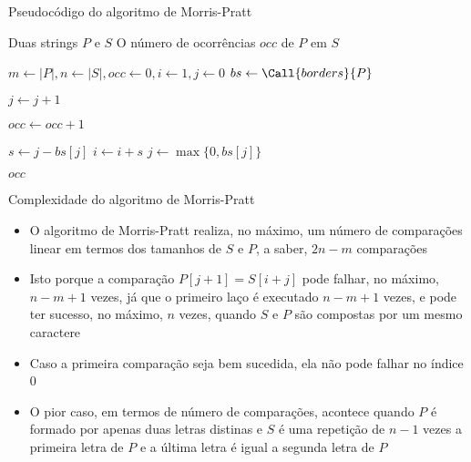 \begin{frame}[fragile]{Pseudocódigo do algoritmo de Morris-Pratt}

    \begin{algorithm}[H]
        \caption{Algoritmo de Morris-Pratt}
        \begin{algorithmic}[1]
            \Require Duas strings $P$ e $S$
            \Ensure O número de ocorrências $occ$ de $P$ em $S$

                \State $m \gets |P|, n \gets |S|, occ \gets 0, i \gets 1, j \gets 0$
                \State $bs \gets \Call{borders}{P}$

                        \State $j \gets j + 1$
                    \EndWhile

                        \State $occ \gets occ + 1$
                    \EndIf

                    \State $s \gets j - bs[j]$
                    \State $i \gets i + s$
                    \State $j \gets \max\lbrace 0, bs[j]\rbrace$
                \EndWhile

                \State \Return $occ$
            \EndFunction
        \end{algorithmic}
    \end{algorithm}

\end{frame}



\begin{frame}[fragile]{Complexidade do algoritmo de Morris-Pratt}

    \begin{itemize}
        \item O algoritmo de Morris-Pratt realiza, no máximo, um número de comparações linear em 
            termos dos tamanhos de $S$ e $P$, a saber, $2n - m$ comparações

        \item Isto porque a comparação $P[j + 1] = S[i + j]$ pode falhar, no máximo, 
            $n - m + 1$ vezes, já que o primeiro laço é executado $n - m + 1$ vezes, e pode ter 
            sucesso, no máximo, $n$ vezes, quando $S$ e $P$ são compostas por um mesmo
            caractere

        \item Caso a primeira comparação seja bem sucedida, ela não pode falhar no índice 0

        \item O pior caso, em termos de número de comparações, acontece quando $P$ é formado
            por  apenas duas letras distinas e $S$ é uma repetição de $n - 1$ vezes a primeira 
            letra de $P$ e a última letra é igual a segunda letra de $P$
    \end{itemize}

\end{frame}

